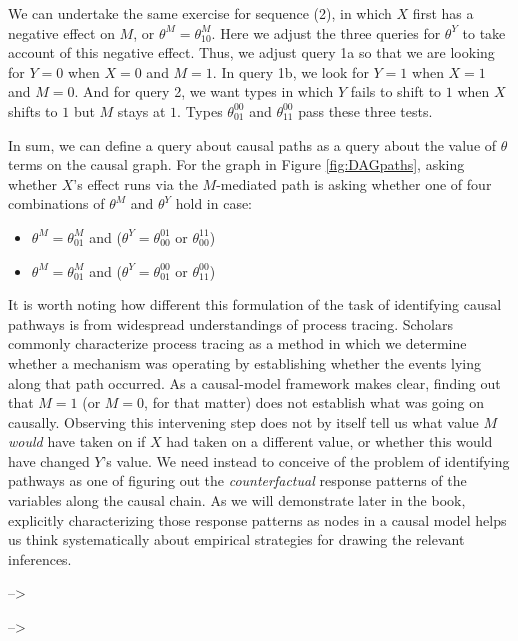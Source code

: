 \documentclass[12pt,]{book}
\providecommand{\tightlist}{%
  \setlength{\itemsep}{0pt}\setlength{\parskip}{0pt}}
\begin{document}
We can undertake the same exercise for sequence (2), in which \(X\) first has a negative effect on \(M\), or \(\theta^M=\theta^M_{10}\). Here we adjust the three queries for \(\theta^Y\) to take account of this negative effect. Thus, we adjust query 1a so that we are looking for \(Y=0\) when \(X=0\) and \(M=1\). In query 1b, we look for \(Y=1\) when \(X=1\) and \(M=0\). And for query 2, we want types in which \(Y\) fails to shift to \(1\) when \(X\) shifts to \(1\) but \(M\) stays at \(1\). Types \(\theta_{01}^{00}\) and \(\theta_{11}^{00}\) pass these three tests.

In sum, we can define a query about causal paths as a query about the value of \(\theta\) terms on the causal graph. For the graph in Figure \ref{fig:DAGpaths}, asking whether \(X\)'s effect runs via the \(M\)-mediated path is asking whether one of four combinations of \(\theta^M\) and \(\theta^Y\) hold in case:

\begin{itemize}
\tightlist
\item
  \(\theta^M=\theta^M_{01}\) and (\(\theta^Y=\theta_{00}^{01}\) or \(\theta_{00}^{11}\))
\item
  \(\theta^M=\theta^M_{01}\) and (\(\theta^Y=\theta_{01}^{00}\) or \(\theta_{11}^{00}\))
\end{itemize}

It is worth noting how different this formulation of the task of identifying causal pathways is from widespread understandings of process tracing. Scholars commonly characterize process tracing as a method in which we determine whether a mechanism was operating by establishing whether the events lying along that path occurred. As a causal-model framework makes clear, finding out that \(M=1\) (or \(M=0\), for that matter) does not establish what was going on causally. Observing this intervening step does not by itself tell us what value \(M\) \emph{would} have taken on if \(X\) had taken on a different value, or whether this would have changed \(Y\)'s value. We need instead to conceive of the problem of identifying pathways as one of figuring out the \emph{counterfactual} response patterns of the variables along the causal chain. As we will demonstrate later in the book, explicitly characterizing those response patterns as nodes in a causal model helps us think systematically about empirical strategies for drawing the relevant inferences.

--\textgreater{}

--\textgreater{}
\end{document}
